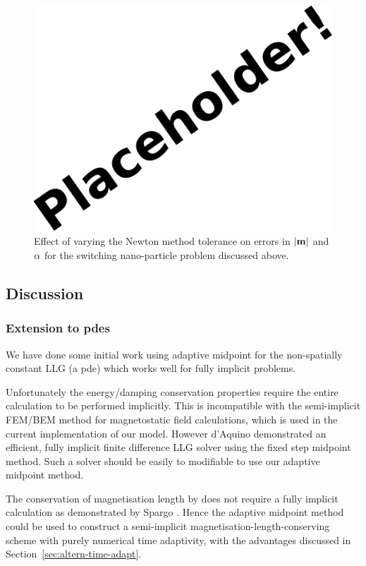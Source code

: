 \begin{figure}[ht!]
  \centering
  \includegraphics{images/placeholder}
  \caption{Effect of varying the Newton method tolerance on errors in $\lvert \mathbf{m} \rvert$ and $\alpha$  for the switching nano-particle problem discussed above.}
  \label{fig:newton-tol-errors-mp}
\end{figure}


\subsection{Discussion}

\subsubsection{Extension to pdes}

We have done some initial work using adaptive midpoint for the non-spatially constant LLG (\ie a pde) which works well for fully implicit problems.

Unfortunately the energy/damping conservation properties require the entire calculation to be performed implicitly.
This is incompatible with the semi-implicit FEM/BEM method for magnetostatic field calculations,\cite{Koehler1997} which is used in the current implementation of our model.
However d'Aquino \etal demonstrated an efficient, fully implicit finite difference LLG solver using the fixed step midpoint method\cite{DAquino2005}.
Such a solver should be easily to modifiable to use our adaptive midpoint method.

The conservation of magnetisation length by \imr does not require a fully implicit calculation as demonstrated by Spargo \etal\cite{Spargo2003a}.
Hence the adaptive midpoint method could be used to construct a semi-implicit magnetisation-length-conserving scheme with purely numerical time adaptivity, with the advantages discussed in Section~\ref{sec:altern-time-adapt}.


